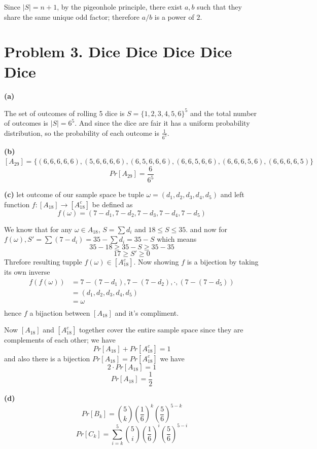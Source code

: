\documentclass{article}
\begin{document}
Since $|S| = n + 1$, by the pigeonhole principle, there exist $a,b$ such that they share the same unique odd factor; therefore $a/b$ is a power of $2$.

\section*{Problem 3. Dice Dice Dice Dice Dice}
\textbf{(a)}

The set of outcomes of rolling 5 dice is $S = \{1,2,3,4,5,6\}^5$ and the total number of outcomes is $|S| = 6^5$. And since the dice are fair
it has a uniform probability distribution, so the probability of each outcome is $\frac{1}{6^5}$.

\vspace{\baselineskip}
\noindent\textbf{(b)}
$[A_{29}] = \{(6,6,6,6,6),(5,6,6,6,6),(6,5,6,6,6),(6,6,5,6,6),(6,6,6,5,6),(6,6,6,6,5)\}$
\[Pr[A_{29}] = \frac{6}{6^5}\]


\vspace{\baselineskip}
\noindent\textbf{(c)}
let outcome of our sample space be tuple $\omega = (d_1,d_2,d_3,d_4,d_5)$ and left function $f:[A_{18}] \rightarrow [A_{18}^c]$ be defined as
\[f(\omega) = (7 - d_1,7 - d_2, 7 - d_3, 7 - d_4, 7 - d_5) \]

We know that for any $\omega \in A_{18}$, $S = \sum d_i$ and $18 \leq S \leq 35$.
and now for $f(\omega), S' = \sum (7 - d_i) = 35 - \sum d_i = 35 - S$ which means
\[35 - 18 \geq 35 - S \geq 35 -35\]
\[17 \geq S' \geq 0\]
Threfore resulting tupple $f(\omega) \in [A_{18}^c]$.
Now showing $f$ is a bijection by taking its own inverse
\[
\begin{aligned}
f(f(\omega)) &= 7 - (7 - d_1),7 - (7 - d_2),\cdot,(7 - (7 - d_5))\\
&= (d_1,d_2,d_3,d_4,d_5)\\
&= \omega\\
\end{aligned}
\]
hence $f$ a bijaction between $[A_{18}]$ and it's compliment.

Now $[A_{18}]$ and $[A_{18}^c]$ together cover the entire sample space since they are complements of each other; we have
\[Pr[A_{18}] + Pr[A_{18}^c] = 1\]
and also there is a bijection $Pr[A_{18}] = Pr[A_{18}^c]$ we have
\[2 \cdot Pr[A_{18}] = 1\]
\[Pr[A_{18}] = \frac{1}{2}\]

\vspace{\baselineskip}
\noindent\textbf{(d)}
\[Pr[B_k] = \binom{5}{k} \left(\frac{1}{6}\right)^k \left(\frac{5}{6}\right)^{5-k} \]
\[Pr[C_k] = \sum_{i=k}^{5} \binom{5}{i} \left(\frac{1}{6}\right)^i \left(\frac{5}{6}\right)^{5-i} \]
\end{document}
